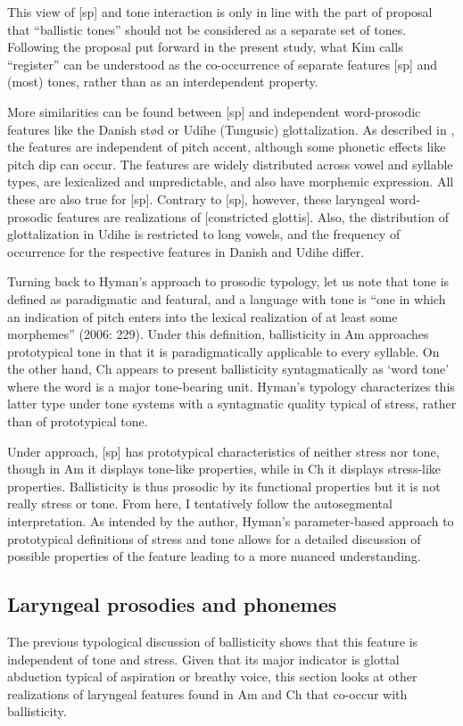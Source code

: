 \documentclass[output=paper]{langscibook}
\begin{document}
This view of [sp] and tone interaction is only in line with the part of  proposal that “ballistic tones” should not be considered as a separate set of tones. Following the proposal put forward in the present study, what Kim calls “register” can be understood as the co-occurrence of separate features [sp] and (most) tones, rather than as an interdependent property. 

More similarities can be found between [sp] and independent word-prosodic features like the Danish stød or Udihe (Tungusic) glottalization. As described in \citet[42--44]{Kuznetsova2022}, the features are independent of pitch accent, although some phonetic effects like pitch dip can occur. The features are widely distributed across vowel and syllable types, are lexicalized and unpredictable, and also have morphemic expression. All these are also true for [sp]. Contrary to [sp], however, these laryngeal word-prosodic features are realizations of [constricted glottis]. Also, the distribution of glottalization in Udihe is restricted to long vowels, and the frequency of occurrence for the respective features in Danish and Udihe differ. 

Turning back to Hyman’s approach to prosodic typology, let us note that tone is defined as paradigmatic and featural, and a language with tone is “one in which an indication of pitch enters into the lexical realization of at least some morphemes” (2006: 229). Under this definition, ballisticity in Am approaches prototypical tone in that it is paradigmatically applicable to every syllable. On the other hand, Ch appears to present ballisticity syntagmatically as ‘word tone’ where the word is a major tone-bearing unit. Hyman’s typology characterizes this latter type under tone systems with a syntagmatic quality typical of stress, rather than of prototypical tone.

Under  approach, [sp] has prototypical characteristics of neither stress nor tone, though in Am it displays tone-like properties, while in Ch it displays stress-like properties. Ballisticity is thus prosodic by its functional properties but it is not really stress or tone. From here, I tentatively follow the autosegmental interpretation. As intended by the author, Hyman’s parameter-based approach to prototypical definitions of stress and tone allows for a detailed discussion of possible properties of the feature leading to a more nuanced understanding.

\subsection{Laryngeal prosodies and phonemes}\label{sec:dobui:4.2}
\label{bkm:Ref133780325}
The previous typological discussion of ballisticity shows that this feature is independent of tone and stress. Given that its major indicator is glottal abduction typical of aspiration or breathy voice, this section looks at other realizations of laryngeal features found in Am and Ch that co-occur with ballisticity. 
\end{document}

